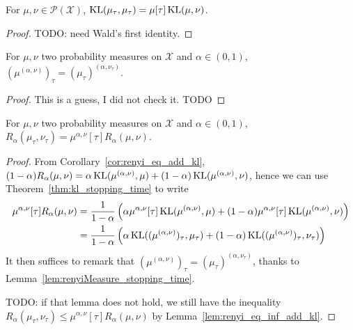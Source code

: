 \begin{theorem}
  \label{thm:kl_stopping_time}
  For $\mu, \nu \in \mathcal P(\mathcal X)$, $\operatorname{KL}(\mu_\tau, \mu_\tau) = \mu[\tau] \operatorname{KL}(\mu, \nu)$.
\end{theorem}

\begin{proof}
TODO: need Wald's first identity.
\end{proof}

\begin{lemma}
  \label{lem:renyiMeasure_stopping_time}
  For $\mu, \nu$ two probability measures on $\mathcal X$ and $\alpha \in (0,1)$, $(\mu^{(\alpha, \nu)})_\tau = (\mu_\tau)^{(\alpha, \nu_\tau)}$.
\end{lemma}

\begin{proof}
This is a guess, I did not check it. TODO
\end{proof}

\begin{theorem}
  \label{thm:renyi_stopping_time}
  For $\mu, \nu$ two probability measures on $\mathcal X$ and $\alpha \in (0,1)$,
  $R_\alpha(\mu_\tau, \nu_\tau) = \mu^{\alpha, \nu}[\tau] R_\alpha(\mu, \nu)$.
\end{theorem}

\begin{proof}
From Corollary~\ref{cor:renyi_eq_add_kl}, $(1 - \alpha) R_\alpha(\mu, \nu) = \alpha \operatorname{KL}(\mu^{(\alpha, \nu)}, \mu) + (1 - \alpha)\operatorname{KL}(\mu^{(\alpha, \nu)}, \nu)$, hence we can use Theorem~\ref{thm:kl_stopping_time} to write
\begin{align*}
\mu^{\alpha, \nu}[\tau] R_\alpha(\mu, \nu)
&= \frac{1}{1 - \alpha}\left(\alpha \mu^{\alpha, \nu}[\tau]\operatorname{KL}(\mu^{(\alpha, \nu)}, \mu) + (1 - \alpha)\mu^{\alpha, \nu}[\tau]\operatorname{KL}(\mu^{(\alpha, \nu)}, \nu) \right)
\\
&= \frac{1}{1 - \alpha}\left(\alpha \operatorname{KL}((\mu^{(\alpha, \nu)})_\tau, \mu_\tau) + (1 - \alpha)\operatorname{KL}((\mu^{(\alpha, \nu)})_\tau, \nu_\tau) \right)
\end{align*}
It then suffices to remark that $(\mu^{(\alpha, \nu)})_\tau = (\mu_\tau)^{(\alpha, \nu_\tau)}$, thanks to Lemma~\ref{lem:renyiMeasure_stopping_time}.

TODO: if that lemma does not hold, we still have the inequality $R_\alpha(\mu_\tau, \nu_\tau) \le \mu^{\alpha, \nu}[\tau] R_\alpha(\mu, \nu)$ by Lemma~\ref{lem:renyi_eq_inf_add_kl}.
\end{proof}
